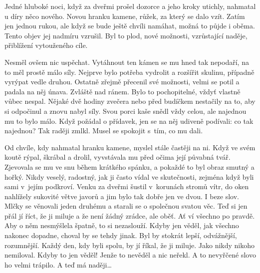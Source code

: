 Jedné hluboké noci, když za dveřmi prošel dozorce a jeho kroky utichly, nahmatal u díry něco nového. Novou hranku kamene, růžek, za který se dalo vzít. Zatím jen jednou rukou, ale když se bude ještě chvíli namáhat, možná to půjde i oběma. Tento objev jej nadmíru vzrušil. Byl to plod, nové možnosti, vzrůstající naděje, přiblížení vytouženého cíle.

Nesměl ovšem nic uspěchat. Vytáhnout ten kámen se mu hned tak nepodaří, na to měl prostě málo síly. Nejprve bylo potřeba vydrolit a rozšířit skulinu, případně vyrýpat vedle druhou. Ostatně zřejmě přecenil své možnosti, velmi se potil a padala na něj únava. Zvláště nad ránem. Bylo to pochopitelné, vždyť vlastně vůbec nespal. Nějaké dvě hodiny zvečera nebo před budíčkem nestačily na to, aby si odpočinul a znovu nabyl síly. Svou porci kaše snědl vždy celou, ale najednou mu to bylo málo. Když požádal o přídavek, jen se na něj udiveně podívali: co tak najednou? Tak raději zmlkl. Musel se spokojit s tím, co mu dali.

Od chvíle, kdy nahmatal hranku kamene, myslel stále častěji na ni. Když ve svém koutě rýpal, škrábal a drolil, vyvstávala mu před očima její půvabná tvář. Zjevovala se mu ve snu během krátkého spánku, a pokaždé to byl obraz smutný a hořký. Nikdy veselý, radostný, jak ji často vídal ve skutečnosti, zejména když byli sami v jejím podkroví. Venku za dveřmi šustil v korunách stromů vítr, do oken nahlížely sukovité větve javorů a jim bylo tak dobře jen ve dvou. I beze slov. Mlčky se věnovali jeden druhému a starali se o společnou svatou věc. Teď si jen přál jí říct, že ji miluje a že není žádný zrádce, ale oběť. Ať ví všechno po pravdě. Aby o něm nesmýšlela špatně, to si nezaslouží. Kdyby jen věděl, jak všechno nakonec dopadne, choval by se tehdy jinak. Byl by stokrát lepší, odvážnější, rozumnější. Každý den, kdy byli spolu, by jí říkal, že ji miluje. Jako nikdy nikoho nemiloval. Kdyby to jen věděl! Jenže to nevěděl a nic neřekl. A to nevyřčené slovo ho velmi trápilo. A teď má naději\ldots

